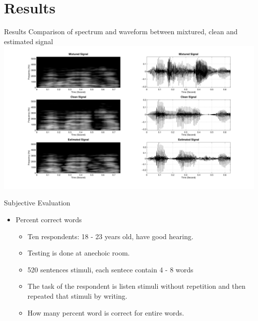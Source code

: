 \documentclass{beamer}
\begin{document}
\section{Results}
\begin{frame}[t]{Results}
Comparison of spectrum and waveform between mixtured, clean and estimated signal
    \includegraphics[scale=0.27]{../pict/spectro07.pdf}
\end{frame}

\begin{frame}[t]{Subjective Evaluation}
\begin{itemize}
\item Percent correct words
\begin{itemize}
	\item Ten respondents: 18 - 23 years old, have good hearing.
	\item Testing is done at anechoic room.
	\item 520 sentences stimuli, each sentece contain 4 - 8 words
	\item The task of the respondent is listen stimuli without repetition and then repeated that stimuli by writing.
	\item How many percent word is correct for entire words.
\end{itemize}
\end{itemize}
\end{frame}
\end{document}
